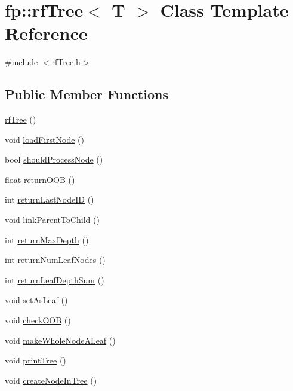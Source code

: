 \hypertarget{classfp_1_1rfTree}{}\section{fp\+:\+:rf\+Tree$<$ T $>$ Class Template Reference}
\label{classfp_1_1rfTree}


{\ttfamily \#include $<$rf\+Tree.\+h$>$}

\subsection*{Public Member Functions}
\begin{DoxyCompactItemize}
\item 
\hyperlink{classfp_1_1rfTree_aace007592f5b94dd9c045207354ea7a6}{rf\+Tree} ()
\item 
void \hyperlink{classfp_1_1rfTree_a8757adc28b68d0a99f95b8bc5d6a38db}{load\+First\+Node} ()
\item 
bool \hyperlink{classfp_1_1rfTree_a36abf82d31ca57670b09da16525dce0d}{should\+Process\+Node} ()
\item 
float \hyperlink{classfp_1_1rfTree_aee6bf6e8e695392880f1cc9ac0102ba6}{return\+O\+OB} ()
\item 
int \hyperlink{classfp_1_1rfTree_a1b8c04f3f3ce362d9627c2ca66d10efd}{return\+Last\+Node\+ID} ()
\item 
void \hyperlink{classfp_1_1rfTree_aceaedc5d54bb429c1a3539f164a93d45}{link\+Parent\+To\+Child} ()
\item 
int \hyperlink{classfp_1_1rfTree_ab439134c1e24059fe74f84ac8eff78dd}{return\+Max\+Depth} ()
\item 
int \hyperlink{classfp_1_1rfTree_a6474edd1b84d70be1712326f9a845139}{return\+Num\+Leaf\+Nodes} ()
\item 
int \hyperlink{classfp_1_1rfTree_a7e0126c03547b4e6ed25b1c452255bbe}{return\+Leaf\+Depth\+Sum} ()
\item 
void \hyperlink{classfp_1_1rfTree_a3583e1f1659ba9a9013a4891709bacb9}{set\+As\+Leaf} ()
\item 
void \hyperlink{classfp_1_1rfTree_a45e47b318c90a1359840ab6161f20ab1}{check\+O\+OB} ()
\item 
void \hyperlink{classfp_1_1rfTree_a2b2a47186c0784415609f1c9b005e702}{make\+Whole\+Node\+A\+Leaf} ()
\item 
void \hyperlink{classfp_1_1rfTree_a89d982d5df6e068079d2fff5f6c15f58}{print\+Tree} ()
\item 
void \hyperlink{classfp_1_1rfTree_aaf9d8cdfbb1d10da53a375ea8204e393}{create\+Node\+In\+Tree} ()

\end{DoxyCompactItemize}
